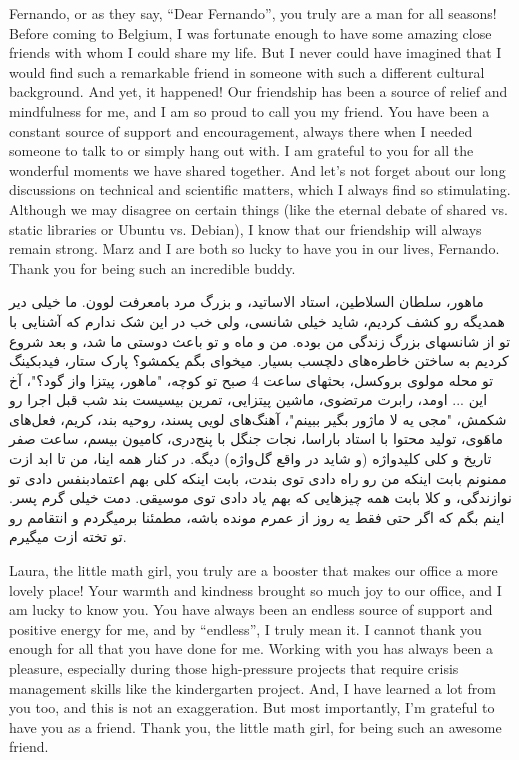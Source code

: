 Fernando, or as they say, ``Dear Fernando'', you truly are a man for all seasons! Before coming to Belgium, I was fortunate enough to have some amazing close friends with whom I could share my life. But I never could have imagined that I would find such a remarkable friend in someone with such a different cultural background. And yet, it happened! Our friendship has been a source of relief and mindfulness for me, and I am so proud to call you my friend. You have been a constant source of support and encouragement, always there when I needed someone to talk to or simply hang out with. I am grateful to you for all the wonderful moments we have shared together. And let's not forget about our long discussions on technical and scientific matters, which I always find so stimulating. Although we may disagree on certain things (like the eternal debate of shared vs. static libraries or Ubuntu vs. Debian), I know that our friendship will always remain strong. Marz and I are both so lucky to have you in our lives, Fernando. Thank you for being such an incredible buddy.

\begin{flushright}
\foreignlanguage{persian}
{
ماهور، سلطان السلاطین، استاد الاساتید، و بزرگ مرد بامعرفت لوون. ما خیلی دیر همدیگه رو کشف کردیم، شاید خیلی شانسی، ولی خب در این شک ندارم که آشنایی با تو از شانسهای بزرگ زندگی من بوده. من و ماه و تو باعث دوستی ما شد، و بعد شروع کردیم به ساختن خاطره‌های دلچسب بسیار. میخوای بگم یکمشو؟ پارک ستار، فیدبکینگ تو محله مولوی بروکسل، بحثهای ساعت 4 صبح تو کوچه، "ماهور، پیتزا واز گود؟"، آخ این ... اومد، رابرت مرتضوی، ماشین پیتزایی، تمرین بیسیست بند شب قبل اجرا رو شکمش، "مجی یه لا ماژور بگیر ببینم"، آهنگ‌های لویی پسند، روحیه بند، کریم، فعل‌های ماهَوی، تولید محتوا با استاد باراسا، نجات جنگل با پنج‌دری، کامیون بیسم، ساعت صفر تاریخ و کلی کلیدواژه (و شاید در واقع گل‌واژه) دیگه. در کنار همه اینا، من تا ابد ازت ممنونم بابت اینکه من رو راه دادی توی بندت، بابت اینکه کلی بهم اعتمادبنفس دادی تو نوازندگی، و کلا بابت همه چیزهایی که بهم یاد دادی توی موسیقی. دمت خیلی گرم پسر. اینم بگم که اگر حتی فقط یه روز از عمرم مونده باشه، مطمئنا برمیگردم و انتقامم رو تو تخته ازت میگیرم.
}
\end{flushright}

Laura, the little math girl, you truly are a booster that makes our office a more lovely place! Your warmth and kindness brought so much joy to our office, and I am lucky to know you. You have always been an endless source of support and positive energy for me, and by ``endless'', I truly mean it.  I cannot thank you enough for all that you have done for me. Working with you has always been a pleasure, especially during those high-pressure projects that require crisis management skills like the kindergarten project. And, I have learned a lot from you too, and this is not an exaggeration. But most importantly, I'm grateful to have you as a friend. Thank you, the little math girl, for being such an awesome friend.

